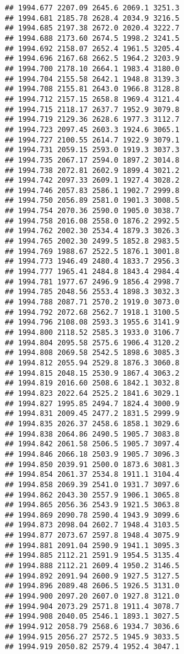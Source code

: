 \documentclass[
]{article}
\begin{document}
\begin{verbatim}
## 1994.677 2207.09 2645.6 2069.1 3251.3
## 1994.681 2185.78 2628.4 2034.9 3216.5
## 1994.685 2197.38 2672.0 2020.4 3222.7
## 1994.688 2173.60 2674.5 1998.2 3241.5
## 1994.692 2158.07 2652.4 1961.5 3205.4
## 1994.696 2167.68 2662.5 1964.2 3203.9
## 1994.700 2178.10 2664.1 1983.4 3180.0
## 1994.704 2155.58 2642.1 1948.8 3139.3
## 1994.708 2155.81 2643.0 1966.8 3128.8
## 1994.712 2157.15 2658.8 1969.4 3121.4
## 1994.715 2118.17 2637.7 1952.9 3079.8
## 1994.719 2129.36 2628.6 1977.3 3112.7
## 1994.723 2097.45 2603.3 1924.6 3065.1
## 1994.727 2100.55 2614.7 1922.9 3079.1
## 1994.731 2059.15 2593.0 1919.3 3037.3
## 1994.735 2067.17 2594.0 1897.2 3014.8
## 1994.738 2072.81 2602.9 1899.4 3021.2
## 1994.742 2097.33 2609.1 1927.4 3028.2
## 1994.746 2057.83 2586.1 1902.7 2999.8
## 1994.750 2056.89 2581.0 1901.3 3008.5
## 1994.754 2070.36 2590.0 1905.0 3038.7
## 1994.758 2016.08 2558.0 1876.2 2992.5
## 1994.762 2002.30 2534.4 1879.3 3026.3
## 1994.765 2002.30 2499.5 1852.8 2983.5
## 1994.769 1988.67 2522.5 1876.1 3001.8
## 1994.773 1946.49 2480.4 1833.7 2956.3
## 1994.777 1965.41 2484.8 1843.4 2984.4
## 1994.781 1977.67 2496.9 1856.4 2998.7
## 1994.785 2048.56 2553.4 1898.3 3032.3
## 1994.788 2087.71 2570.2 1919.0 3073.0
## 1994.792 2072.68 2562.7 1918.1 3100.5
## 1994.796 2108.08 2593.3 1955.6 3141.9
## 1994.800 2118.52 2585.3 1933.0 3106.7
## 1994.804 2095.58 2575.6 1906.4 3120.2
## 1994.808 2069.58 2542.5 1898.6 3085.3
## 1994.812 2055.94 2529.8 1876.3 3060.8
## 1994.815 2048.15 2530.9 1867.4 3063.2
## 1994.819 2016.60 2508.6 1842.1 3032.8
## 1994.823 2022.64 2525.2 1841.6 3029.1
## 1994.827 1995.85 2494.7 1824.4 3000.9
## 1994.831 2009.45 2477.2 1831.5 2999.9
## 1994.835 2026.37 2458.6 1858.1 3029.6
## 1994.838 2064.86 2490.5 1905.7 3083.8
## 1994.842 2061.58 2506.5 1905.7 3097.4
## 1994.846 2066.18 2503.9 1905.7 3096.3
## 1994.850 2039.91 2500.0 1873.6 3081.3
## 1994.854 2061.37 2534.8 1911.1 3104.4
## 1994.858 2069.39 2541.0 1931.7 3097.6
## 1994.862 2043.30 2557.9 1906.1 3065.8
## 1994.865 2056.36 2543.9 1921.5 3063.8
## 1994.869 2090.78 2590.4 1943.9 3099.6
## 1994.873 2098.04 2602.7 1948.4 3103.5
## 1994.877 2073.67 2597.8 1948.4 3075.9
## 1994.881 2091.04 2590.9 1941.1 3095.3
## 1994.885 2112.21 2591.9 1954.5 3135.4
## 1994.888 2112.21 2609.4 1950.2 3146.5
## 1994.892 2091.94 2600.9 1927.5 3127.5
## 1994.896 2089.48 2606.5 1926.5 3131.0
## 1994.900 2097.20 2607.0 1927.8 3121.0
## 1994.904 2073.29 2571.8 1911.4 3078.7
## 1994.908 2040.05 2546.1 1893.1 3027.5
## 1994.912 2058.79 2568.6 1934.7 3036.6
## 1994.915 2056.27 2572.5 1945.9 3033.5
## 1994.919 2050.82 2579.4 1952.4 3047.1

\end{verbatim}
\end{document}
